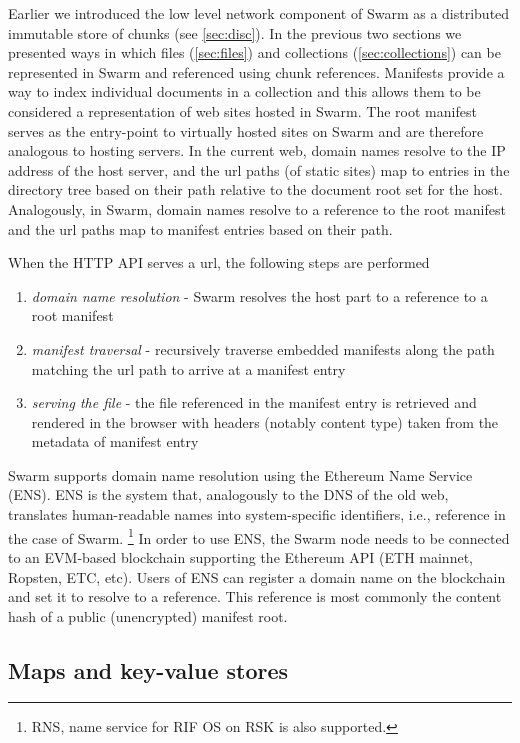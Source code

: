 Earlier we introduced the low level network component of Swarm as a distributed immutable store of chunks (see \ref{sec:disc}). In the previous two sections we presented ways in which files (\ref{sec:files}) and collections (\ref{sec:collections}) can be represented in Swarm and referenced using chunk references. Manifests provide a way to index individual documents in a collection and this allows them to be considered a representation of web sites hosted in Swarm. The root manifest serves as the entry-point to virtually hosted sites on Swarm and are therefore analogous to hosting servers. In the current web, domain names resolve to the IP address of the host server, and the url paths (of static sites) map to entries in the directory tree based on their path relative to the document root set for the host.
Analogously, in Swarm, domain names resolve to a reference to the root manifest and the url paths map to manifest entries based on their path.  

When the HTTP API serves a url, the following steps are performed

\begin{enumerate}
    \item \emph{domain name resolution} - Swarm resolves the host part to a reference to a root manifest
    \item \emph{manifest traversal} - recursively traverse embedded manifests along the path matching the url path to arrive at a manifest entry
    \item \emph{serving the file} - the file referenced in the manifest entry is retrieved and rendered in the browser with headers (notably content type) taken from  the metadata of manifest entry
\end{enumerate}

Swarm supports domain name resolution using the Ethereum Name Service (ENS). ENS is the system that, analogously to the DNS of the old web, translates human-readable names into system-specific identifiers, i.e., reference in the case of Swarm.%
%
\footnote{RNS, name service for RIF OS on RSK is also supported.}
%
In order to use ENS, the Swarm node needs to be connected to an EVM-based blockchain supporting the Ethereum API (ETH mainnet, Ropsten, ETC, etc). 
Users of ENS can register a domain name on the blockchain  and set it to resolve to a reference. This reference is most commonly the content hash of a public (unencrypted) manifest root. 


\subsection{Maps and key-value stores}\label{sec:maps}

